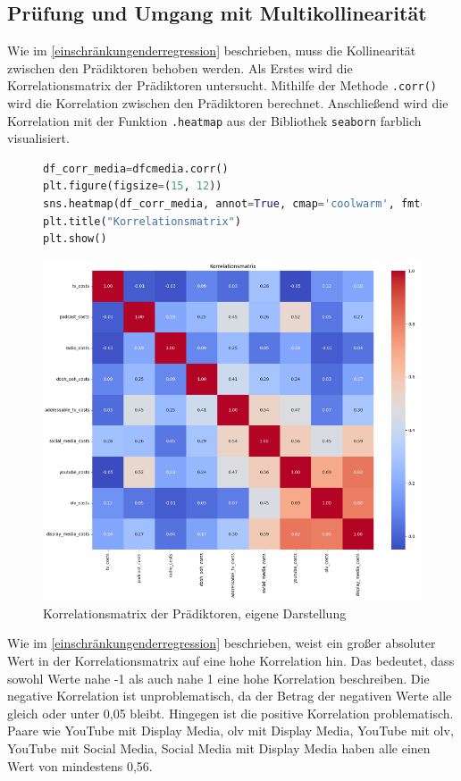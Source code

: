 \subsection{Prüfung und Umgang mit Multikollinearität}
\label{PrüfungUndUmgangMitMultikollinearität}
Wie im \autoref{einschränkungenderregression} beschrieben, muss die Kollinearität zwischen den Prädiktoren behoben werden. Als Erstes wird die Korrelationsmatrix der Prädiktoren untersucht. Mithilfe der Methode \verb|.corr()| wird die Korrelation zwischen den Prädiktoren berechnet. Anschließend wird die Korrelation mit der Funktion \verb|.heatmap| aus der Bibliothek \verb|seaborn| farblich visualisiert.
\begin{figure}[H]
    \centering
    \begin{lstlisting}[language=Python, linewidth=\textwidth]
df_corr_media=dfcmedia.corr() 
plt.figure(figsize=(15, 12))
sns.heatmap(df_corr_media, annot=True, cmap='coolwarm', fmt=".2f")
plt.title("Korrelationsmatrix")
plt.show()
\end{lstlisting}
    \includegraphics[width=1\linewidth]{images/korrelationsmatrix.png}
    \caption{Korrelationsmatrix der Prädiktoren, eigene Darstellung}
    \label{fig:korrelationsmatrix}
\end{figure}
Wie im \autoref{einschränkungenderregression} beschrieben, weist ein großer absoluter Wert in der Korrelationsmatrix auf eine hohe Korrelation hin. Das bedeutet, dass sowohl Werte nahe -1 als auch nahe 1 eine hohe Korrelation beschreiben. Die negative Korrelation ist unproblematisch, da der Betrag der negativen Werte alle gleich oder unter 0,05 bleibt. Hingegen ist die positive Korrelation problematisch. Paare wie YouTube mit Display Media, \ac{olv} mit Display Media, YouTube mit \ac{olv}, YouTube mit Social Media, Social Media mit Display Media haben alle einen Wert von mindestens 0,56. \\\\
